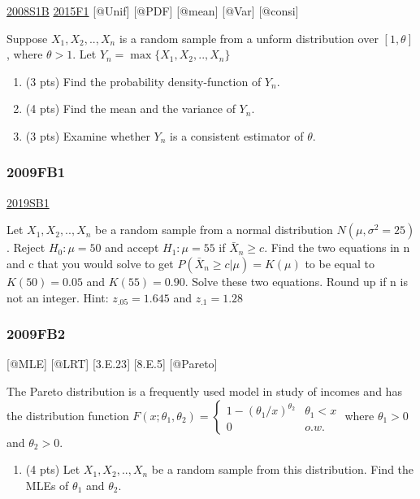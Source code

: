 \documentclass[6pt,twocolumn,Portrait]{article}
\providecommand{\tightlist}{%
  \setlength{\itemsep}{0pt}\setlength{\parskip}{0pt}}
\begin{document}
\protect\hyperlink{s1b}{2008S1B} \protect\hyperlink{f1-5}{2015F1}
{[}@Unif{]} {[}@PDF{]} {[}@mean{]} {[}@Var{]} {[}@consi{]}

Suppose \(X_1,X_2,..,X_{n}\) is a random sample from a unform
distribution over \([1,\theta]\), where \(\theta>1\). Let
\(Y_{n}=\max\{X_1,X_2,..,X_{n}\}\)

\begin{enumerate}
\def\labelenumi{(\alph{enumi})}
\item
  (3 pts) Find the probability density-function of \(Y_{n}\).
\item
  (4 pts) Find the mean and the variance of \(Y_{n}\).
\item
  (3 pts) Examine whether \(Y_{n}\) is a consistent estimator of
  \(\theta\).
\end{enumerate}

\hypertarget{fb1}{%
\subsubsection{2009FB1}\label{fb1}}

\protect\hyperlink{sb1-3}{2019SB1}

Let \(X_1,X_2,..,X_n\) be a random sample from a normal distribution
\(N(\mu,\sigma^2=25)\). Reject \(H_0:\mu=50\) and accept \(H_1:\mu=55\)
if \(\bar X_n\ge c\). Find the two equations in n and c that you would
solve to get \(P(\bar X_n\ge c|\mu)=K(\mu)\) to be equal to
\(K(50)=0.05\) and \(K(55)=0.90\). Solve these two equations. Round up
if n is not an integer. Hint: \(z_{.05}=1.645\) and \(z_{.1}=1.28\)

\hypertarget{fb2}{%
\subsubsection{2009FB2}\label{fb2}}

{[}@MLE{]} {[}@LRT{]} {[}3.E.23{]} {[}8.E.5{]} {[}@Pareto{]}

The Pareto distribution is a frequently used model in study of incomes
and has the distribution function
\(F(x;\theta_1,\theta_2)=\begin{cases}1-(\theta_1/x)^{\theta_2}& \theta_1<x\\0& o.w.\end{cases}\)
where \(\theta_1>0\) and \(\theta_2>0\).

\begin{enumerate}
\def\labelenumi{(\alph{enumi})}
\tightlist
\item
  (4 pts) Let \(X_1,X_2,..,X_n\) be a random sample from this
  distribution. Find the MLEs of \(\theta_1\) and \(\theta_2\).
\end{enumerate}
\end{document}

